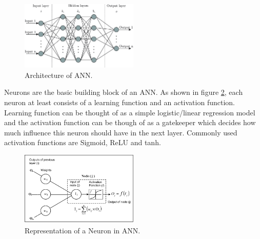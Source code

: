 \documentclass[twoside,11pt,a4paper]{article}
\begin{document}
\begin{figure}[ht]
	\centering
	\includegraphics[width=0.5\textwidth]{ann}
	\caption[Architecture of \acf{ANN}.]{Architecture of \acf{ANN}\cite{bre2018prediction}.}
	\label{fig:ann}
\end{figure}
\FloatBarrier
Neurons are the basic building block of an \acs{ANN}. As shown in figure \ref{fig:ann_node}, each neuron at least consists of a learning function and an activation function. Learning function can be thought of as a simple logistic/linear regression model and the activation function can be though of as a gatekeeper which decides how much influence this neuron should have in the next layer. Commonly used activation functions are Sigmoid, \acs{ReLU} and tanh. \\
\begin{figure}[ht]
	\centering
	\includegraphics[width=0.5\textwidth]{ann_node}
	\caption[Representation of a Neuron in \acf{ANN}.]{Representation of a Neuron in \acf{ANN}.\cite{ghedira2004effect}}
	\label{fig:ann_node}
\end{figure}
\FloatBarrier
\end{document}
